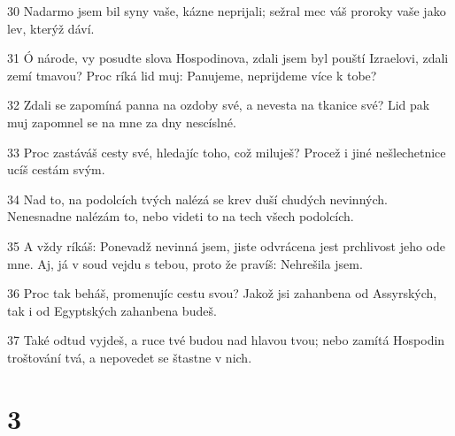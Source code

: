 \par 30 Nadarmo jsem bil syny vaše, kázne neprijali; sežral mec váš proroky vaše jako lev, kterýž dáví.
\par 31 Ó národe, vy posudte slova Hospodinova, zdali jsem byl pouští Izraelovi, zdali zemí tmavou? Proc ríká lid muj: Panujeme, neprijdeme více k tobe?
\par 32 Zdali se zapomíná panna na ozdoby své, a nevesta na tkanice své? Lid pak muj zapomnel se na mne za dny nescíslné.
\par 33 Proc zastáváš cesty své, hledajíc toho, což miluješ? Procež i jiné nešlechetnice ucíš cestám svým.
\par 34 Nad to, na podolcích tvých nalézá se krev duší chudých nevinných. Nenesnadne nalézám to, nebo videti to na tech všech podolcích.
\par 35 A vždy ríkáš: Ponevadž nevinná jsem, jiste odvrácena jest prchlivost jeho ode mne. Aj, já v soud vejdu s tebou, proto že pravíš: Nehrešila jsem.
\par 36 Proc tak beháš, promenujíc cestu svou? Jakož jsi zahanbena od Assyrských, tak i od Egyptských zahanbena budeš.
\par 37 Také odtud vyjdeš, a ruce tvé budou nad hlavou tvou; nebo zamítá Hospodin troštování tvá, a nepovedet se štastne v nich.

\chapter{3}

